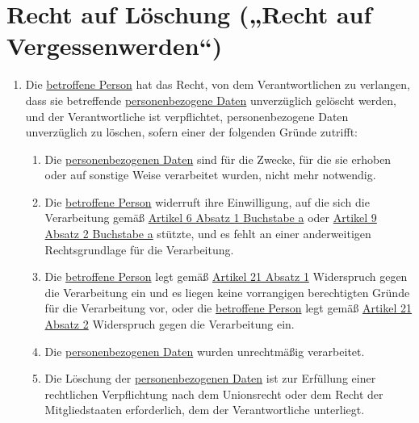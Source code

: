 \chapter{Recht auf Löschung („Recht auf Vergessenwerden“)}
\label{ch:17}


\begin{enumerate}

  \item Die \hyperref[itm:04-1]{betroffene Person} hat das Recht, von dem Verantwortlichen zu verlangen, dass sie betreffende
   \hyperref[itm:04-1]{personenbezogene Daten} unverzüglich gelöscht werden, und der Verantwortliche ist verpflichtet, personenbezogene
   Daten unverzüglich zu löschen, sofern einer der folgenden Gründe zutrifft:
  \label{itm:17-1}

  \begin{enumerate}
  
    \item Die \hyperref[itm:04-1]{personenbezogenen Daten} sind für die Zwecke, für die sie erhoben oder auf sonstige Weise verarbeitet
     wurden, nicht mehr notwendig.
    \label{itm:17-1a}

    \item Die \hyperref[itm:04-1]{betroffene Person} widerruft ihre Einwilligung, auf die sich die Verarbeitung gemäß \hyperref[itm:06-1a]
     {Artikel 6 Absatz 1 Buchstabe a} oder \hyperref[itm:09-2a]{Artikel 9 Absatz 2 Buchstabe a} stützte, und es fehlt
     an einer anderweitigen Rechtsgrundlage für die Verarbeitung.
    \label{itm:17-1b}

    \item Die \hyperref[itm:04-1]{betroffene Person} legt gemäß \hyperref[itm:21-1]{Artikel 21 Absatz 1} Widerspruch gegen die Verarbeitung
     ein und es liegen keine vorrangigen berechtigten Gründe für die Verarbeitung vor, oder die \hyperref[itm:04-1]{betroffene Person} legt
     gemäß \hyperref[itm:21-2]{Artikel 21 Absatz 2} Widerspruch gegen die Verarbeitung ein.
    \label{itm:17-1c}

    \item Die \hyperref[itm:04-1]{personenbezogenen Daten} wurden unrechtmäßig verarbeitet.
    \label{itm:17-1d}

    \item Die Löschung der \hyperref[itm:04-1]{personenbezogenen Daten} ist zur Erfüllung einer rechtlichen Verpflichtung nach dem
     Unionsrecht oder dem Recht der Mitgliedstaaten erforderlich, dem der Verantwortliche unterliegt.
    \label{itm:17-1e}


\end{enumerate}
\end{enumerate}
